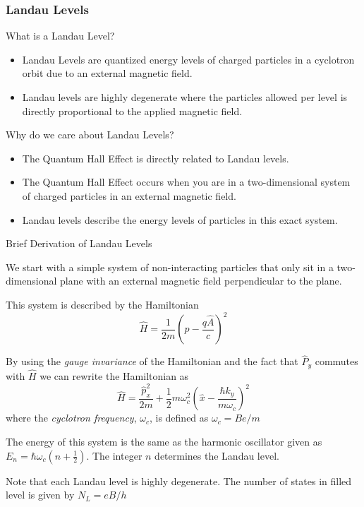 \documentclass{beamer}
\begin{document}
\begin{frame}
\frametitle{Landau Levels}
\begin{block}
{What is a Landau Level?}
\begin{itemize}
\item Landau Levels are quantized energy levels of charged particles in a cyclotron orbit due to an external magnetic field.
\item Landau levels are highly degenerate where the particles allowed per level is directly proportional to the applied magnetic field. 
\end{itemize}
\end{block}
\begin{block}
{Why do we care about Landau Levels?}
\begin{itemize}
\item The Quantum Hall Effect is directly related to Landau levels.
\item The Quantum Hall Effect occurs when you are in a two-dimensional system of charged particles in an external magnetic field.
\item Landau levels describe the energy levels of particles in this exact system.
\end{itemize}
\end{block}
\end{frame}

\begin{frame}
\begin{block}
{Brief Derivation of Landau Levels}
\begin{itemize}
\footnotesize{
\item We start with a simple system of non-interacting particles that only sit in a two-dimensional plane with an external magnetic field perpendicular to the plane.
\item This system is described by the Hamiltonian 
$$\hat{H} = \frac{1}{2m}\left(\hat{p} - \frac{q\hat{A}}{c}\right)^2$$
\item By using the \emph{gauge invariance} of the Hamiltonian and the fact that $\hat{P}_y$ commutes with $\hat{H}$ we can rewrite the Hamiltonian as
$$\hat{H} = \frac{\hat{p}_x^2}{2m} + \frac{1}{2}m\omega_c^2\left(\hat{x}-\frac{\hbar k_y}{m\omega_c}\right)^2$$
where the \emph{cyclotron frequency}, $\omega_c$, is defined as $\omega_c = Be/m$
\item The energy of this system is the same as the harmonic oscillator given as $E_n = \hbar\omega_c\left(n+\frac{1}{2}\right)$. The integer $n$ determines the Landau level. 
\item Note that each Landau level is highly degenerate. The number of states in filled level is given by $N_L = eB/h$ \cite{Klitz1980}
}
\end{itemize}
\end{block}
\end{frame}
\end{document}

